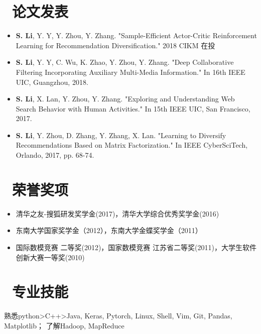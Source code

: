 \documentclass{resume}
\begin{document}
\section{\faBook\ 论文发表}
\begin{itemize}
	\item \textbf{S. Li}, Y. Y, Y. Zhou, Y. Zhang. "Sample-Efficient Actor-Critic Reinforcement Learning for Recommendation Diversification." 2018 CIKM 在投
	\item \textbf{S. Li}, Y. Y, C. Wu, K. Zhao, Y. Zhou, Y. Zhang. "Deep Collaborative Filtering Incorporating Auxiliary Multi-Media Information." In 16th IEEE UIC, Guangzhou, 2018.
	\item \textbf{S. Li}, X. Lan, Y. Zhou, Y. Zhang. "Exploring and Understanding Web Search Behavior with Human Activities." In 15th IEEE UIC, San Francisco, 2017.
	\item \textbf{S. Li}, Y. Zhou, D. Zhang, Y. Zhang, X. Lan. "Learning to Diversify Recommendations Based on Matrix Factorization." In IEEE CyberSciTech, Orlando, 2017, pp. 68-74.
\end{itemize}

\section{\faTrophy\ 荣誉奖项}
\begin{itemize}[parsep=0.5ex]
	\item 清华之友-搜狐研发奖学金(2017)，清华大学综合优秀奖学金(2016) 
	\item 东南大学国家奖学金（2012），东南大学金蝶奖学金（2011）
	\item 国际数模竞赛 二等奖(2012)，国家数模竞赛 江苏省二等奖(2011)，大学生软件创新大赛一等奖(2010)
\end{itemize}

\section{\faCogs\ 专业技能}
熟悉python>C++>Java, Keras, Pytorch, Linux, Shell, Vim, Git, Pandas, Matplotlib； 了解Hadoop, MapReduce
\end{document}
